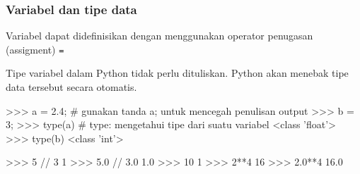 \begin{frame}[fragile]
\frametitle{Variabel dan tipe data}

Variabel dapat didefinisikan dengan menggunakan operator penugasan
(assigment) \texttt{=}

Tipe variabel dalam Python tidak perlu dituliskan. Python akan menebak
tipe data tersebut secara otomatis.

\begin{pyconcode}
>>> a = 2.4;  # gunakan tanda a; untuk mencegah penulisan output
>>> b = 3;
>>> type(a) # type: mengetahui tipe dari suatu variabel
<class 'float'>
>>> type(b)
<class 'int'>
\end{pyconcode}

\begin{pyconcode}
>>> 5 // 3
1
>>> 5.0 // 3.0
1.0
>>> 10 %
1
>>> 2**4
16
>>> 2.0**4
16.0
\end{pyconcode}

\end{frame}



